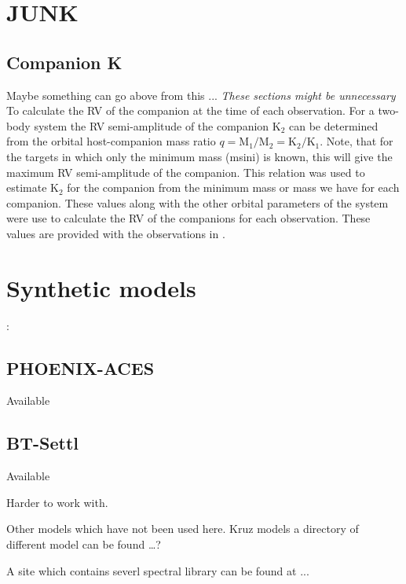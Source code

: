 \section{JUNK}


\subsection{Companion K}  Maybe something can go above from this ...
\label{sec:companion_RV}
\emph{These sections might be unnecessary}\\

To calculate the {RV} of the companion at the time of each observation. For a two-body system the {RV} semi-amplitude of the companion \(\textrm{K}_{2}\) can be determined from the orbital host-companion mass ratio $q = \textrm{M}_{1}/\textrm{M}_{2} = \textrm{K}_{2}/\textrm{K}_{1}$.
Note, that for the targets in which only the minimum mass (msini) is known, this will give the maximum {RV} semi-amplitude of the companion.
This relation was used to estimate \(\textrm{K}_2\) for the companion from the minimum mass or mass we have for each companion. These values along with the other orbital parameters of the system were use to calculate the {RV} of the companions for each observation. These values are provided with the observations in .


\section{Synthetic models}:

\subsection{PHOENIX-ACES}

Available 


\subsection{BT-Settl}

Available  

Harder to work with.

Other models which have not been used here. Kruz models a directory of different model can be found \ldots{}?

A site which contains severl spectral library can be found at ...

